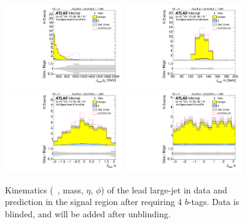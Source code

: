 \begin{figure}[htbp!]
\begin{center}
\includegraphics[width=0.45\textwidth,angle=-90]{figures/boosted/Signal/b77_FourTag_Signal_leadHCand_Pt_m_blind.pdf}
\includegraphics[width=0.45\textwidth,angle=-90]{figures/boosted/Signal/b77_FourTag_Signal_leadHCand_Mass_s_blind.pdf}\\
\includegraphics[width=0.45\textwidth,angle=-90]{figures/boosted/Signal/b77_FourTag_Signal_leadHCand_Eta_blind.pdf}
\includegraphics[width=0.45\textwidth,angle=-90]{figures/boosted/Signal/b77_FourTag_Signal_leadHCand_Phi_blind.pdf}
  \caption{Kinematics (\pt~, mass, $\eta$, $\phi$) of the lead large-\R jet in data and prediction in the signal region after requiring 4 $b$-tags. Data is blinded, and will be added after unblinding.}
  \label{fig:boosted-4b-signal-blind-ak10-lead}
\end{center}
\end{figure}

